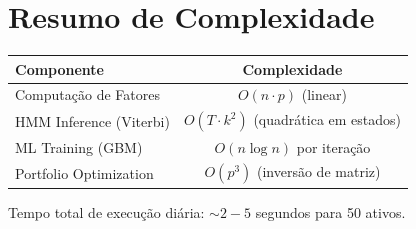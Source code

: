 \documentclass[12pt,a4paper]{article}
\begin{document}
\section{Resumo de Complexidade}

\begin{center}
\begin{tabular}{|l|c|}
\hline
\textbf{Componente} & \textbf{Complexidade} \\
\hline
Computação de Fatores & $O(n \cdot p)$ (linear) \\
HMM Inference (Viterbi) & $O(T \cdot k^2)$ (quadrática em estados) \\
ML Training (GBM) & $O(n \log n)$ por iteração \\
Portfolio Optimization & $O(p^3)$ (inversão de matriz) \\
\hline
\end{tabular}
\end{center}

Tempo total de execução diária: $\sim 2-5$ segundos para 50 ativos.
\end{document}
